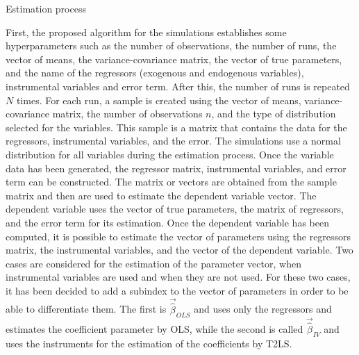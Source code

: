 \documentclass{article}
\begin{document}
\begin{algorithm}[hbt!]
\caption{Estimation process}\label{alg:two}
\end{algorithm}
\newline
First, the proposed algorithm for the simulations establishes some hyperparameters such as the number of observations, the number of runs, the vector of means, the variance-covariance matrix, the vector of true parameters, and the name of the regressors (exogenous and endogenous variables), instrumental variables and error term.
After this, the number of runs is repeated $N$ times. For each run, a sample is created using the vector of means, variance-covariance matrix, the number of observations $n$, and the type of distribution selected for the variables. This sample is a matrix that contains the data for the regressors, instrumental variables, and the error. The simulations use a normal distribution for all variables during the estimation process. 
\newline
Once the variable data has been generated, the regressor matrix, instrumental variables, and error term can be constructed. The matrix or vectors are obtained from the sample matrix and then are used to estimate the dependent variable vector. The dependent variable uses the vector of true parameters, the matrix of regressors, and the error term for its estimation. Once the dependent variable has been computed, it is possible to estimate the vector of parameters using the regressors matrix, the instrumental variables, and the vector of the dependent variable. Two cases are considered for the estimation of the parameter vector, when instrumental variables are used and when they are not used. For these two cases, it has been decided to add a subindex to the vector of parameters in order to be able to differentiate them. The first is $\vec{\hat{\beta}}_{OLS}$ and uses only the regressors and estimates the coefficient parameter by OLS, while the second is called $\vec{\hat{\beta}}_{IV}$ and uses the instruments for the estimation of the coefficients by T2LS.
\end{document}
